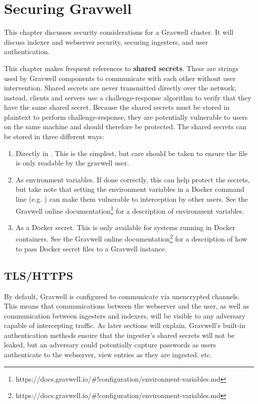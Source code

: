 \chapter{Securing Gravwell}
This chapter discusses security considerations for a Gravwell cluster.
It will discuss indexer and webserver security, securing ingesters, and
user authentication.

This chapter makes frequent references to \textbf{shared secrets}. These are
strings used by Gravwell components to communicate with each other
without user intervention. Shared secrets are never transmitted directly
over the network; instead, clients and servers use a challenge-response
algorithm to verify that they have the same shared secret. Because the
shared secrets must be stored in plaintext to perform
challenge-response, they are potentially vulnerable to users on the same
machine and should therefore be protected. The shared secrets can be
stored in three different ways:

\begin{enumerate}
\tightlist
\item
  Directly in . This is the simplest, but care should
  be taken to ensure the file is only readable by the gravwell user.
\item
  As environment variables. If done correctly, this can help protect
  the secrets, but take note that setting the environment variables in a
  Docker command line (e.g. ) can
  make them vulnerable to interception by other users. See
  the Gravwell online documentation\footnote{https://docs.gravwell.io/\#!configuration/environment-variables.md} for a description of environment variables.
\item
  As a Docker secret. This is only available for systems running in
  Docker containers. See
  the Gravwell online documentation\footnote{https://docs.gravwell.io/\#!configuration/environment-variables.md} for a description of how to pass Docker secret files to a Gravwell instance.
\end{enumerate}



\section{TLS/HTTPS}
\label{sec:tls}
By default, Gravwell is configured to communicate via unencrypted
channels. This means that communications between the webserver and the
user, as well as communication between ingesters and indexers, will be
visible to any adversary capable of intercepting traffic. As later
sections will explain, Gravwell's built-in authentication methods ensure
that the ingester's shared secrets will not be leaked, but an adversary
could potentially capture passwords as users authenticate to the
webserver, view entries as they are ingested, etc.

